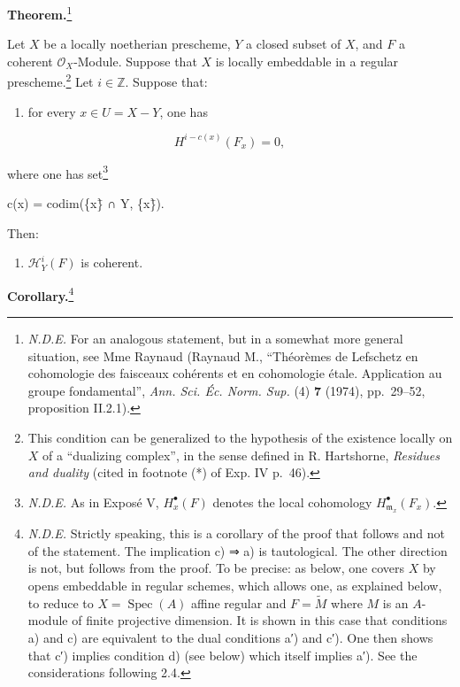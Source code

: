 \documentclass[
]{article}
\newenvironment{Shaded}{}{}
\newcommand{\NormalTok}[1]{#1}
\providecommand{\tightlist}{%
  \setlength{\itemsep}{0pt}\setlength{\parskip}{0pt}}
\begin{document}
\textbf{Theorem.}\footnote{\emph{N.D.E.} For an analogous statement, but
  in a somewhat more general situation, see Mme Raynaud (Raynaud M.,
  ``Théorèmes de Lefschetz en cohomologie des faisceaux cohérents et en
  cohomologie étale. Application au groupe fondamental'', \emph{Ann.
  Sci. Éc. Norm. Sup.} (4) \textbf{7} (1974), pp.~29--52, proposition
  II.2.1).}

Let \(X\) be a locally noetherian prescheme, \(Y\) a closed subset of
\(X\), and \(F\) a coherent \(\mathcal{O}_{X}\)-Module. Suppose that
\(X\) is locally embeddable in a regular prescheme.\footnote{This
  condition can be generalized to the hypothesis of the existence
  locally on \(X\) of a ``dualizing complex'', in the sense defined in
  R. Hartshorne, \emph{Residues and duality} (cited in footnote (*) of
  Exp. IV p.~46).} Let \(i \in \mathbb{Z}\). Suppose that:

\begin{enumerate}
\def\labelenumi{\alph{enumi})}
\tightlist
\item
  for every \(x \in U = X - Y\), one has
\end{enumerate}

\[
H^{i-c(x)}(F_{x}) = 0,
\]

where one has set\footnote{\emph{N.D.E.} As in Exposé V,
  \(H^{\bullet}_{x}(F)\) denotes the local cohomology
  \(H^{\bullet}_{\mathfrak{m}_{x}}(F_{x})\).}

\begin{Shaded}
\begin{Highlighting}[]
\NormalTok{c(x) = codim(\{x\}̄ ∩ Y, \{x\}̄).}
\end{Highlighting}
\end{Shaded}

Then:

\begin{enumerate}
\def\labelenumi{\alph{enumi})}
\setcounter{enumi}{1}
\tightlist
\item
  \(\mathcal{H}^{i}_{Y}(F)\) is coherent.
\end{enumerate}

\textbf{Corollary.}\footnote{\emph{N.D.E.} Strictly speaking, this is a
  corollary of the proof that follows and not of the statement. The
  implication c) ⇒ a) is tautological. The other direction is not, but
  follows from the proof. To be precise: as below, one covers \(X\) by
  opens embeddable in regular schemes, which allows one, as explained
  below, to reduce to \(X = \operatorname{Spec}(A)\) affine regular and
  \(F = \tilde{M}\) where \(M\) is an \(A\)-module of finite projective
  dimension. It is shown in this case that conditions a) and c) are
  equivalent to the dual conditions a′) and c′). One then shows that c′)
  implies condition d) (see below) which itself implies a′). See the
  considerations following 2.4.}
\end{document}
